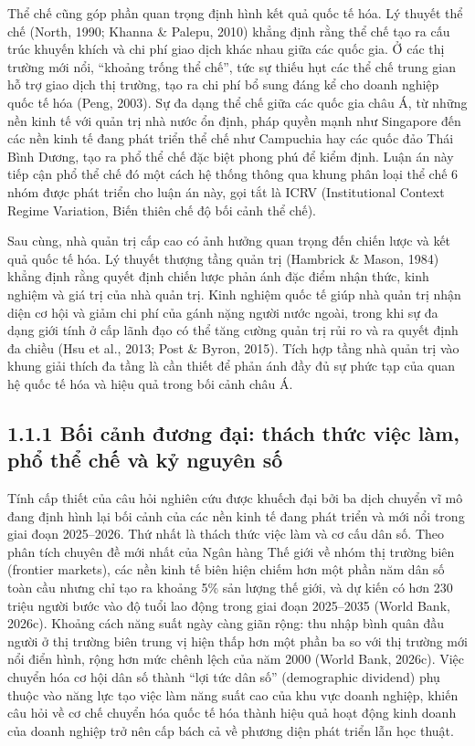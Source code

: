 \documentclass[
  a4paper,
  13pt]{extreport}
\begin{document}
Thể chế cũng góp phần quan trọng định hình kết quả quốc tế hóa. Lý
thuyết thể chế (North, 1990; Khanna \& Palepu, 2010) khẳng định rằng thể
chế tạo ra cấu trúc khuyến khích và chi phí giao dịch khác nhau giữa các
quốc gia. Ở các thị trường mới nổi, ``khoảng trống thể chế'', tức sự
thiếu hụt các thể chế trung gian hỗ trợ giao dịch thị trường, tạo ra chi
phí bổ sung đáng kể cho doanh nghiệp quốc tế hóa (Peng, 2003). Sự đa
dạng thể chế giữa các quốc gia châu Á, từ những nền kinh tế với quản trị
nhà nước ổn định, pháp quyền mạnh như Singapore đến các nền kinh tế đang
phát triển thể chế như Campuchia hay các quốc đảo Thái Bình Dương, tạo
ra phổ thể chế đặc biệt phong phú để kiểm định. Luận án này tiếp cận phổ
thể chế đó một cách hệ thống thông qua khung phân loại thể chế 6 nhóm
được phát triển cho luận án này, gọi tắt là ICRV (Institutional Context
Regime Variation, Biến thiên chế độ bối cảnh thể chế).

Sau cùng, nhà quản trị cấp cao có ảnh hưởng quan trọng đến chiến lược và
kết quả quốc tế hóa. Lý thuyết thượng tầng quản trị (Hambrick \& Mason,
1984) khẳng định rằng quyết định chiến lược phản ánh đặc điểm nhận thức,
kinh nghiệm và giá trị của nhà quản trị. Kinh nghiệm quốc tế giúp nhà
quản trị nhận diện cơ hội và giảm chi phí của gánh nặng người nước
ngoài, trong khi sự đa dạng giới tính ở cấp lãnh đạo có thể tăng cường
quản trị rủi ro và ra quyết định đa chiều (Hsu et al., 2013; Post \&
Byron, 2015). Tích hợp tầng nhà quản trị vào khung giải thích đa tầng là
cần thiết để phản ánh đầy đủ sự phức tạp của quan hệ quốc tế hóa và hiệu
quả trong bối cảnh châu Á.

\hypertarget{bux1ed1i-cux1ea3nh-ux111ux1b0ux1a1ng-ux111ux1ea1i-thuxe1ch-thux1ee9c-viux1ec7c-luxe0m-phux1ed5-thux1ec3-chux1ebf-vuxe0-kux1ef7-nguyuxean-sux1ed1}{%
\subsection{1.1.1 Bối cảnh đương đại: thách thức việc làm, phổ thể chế
và kỷ nguyên
số}\label{bux1ed1i-cux1ea3nh-ux111ux1b0ux1a1ng-ux111ux1ea1i-thuxe1ch-thux1ee9c-viux1ec7c-luxe0m-phux1ed5-thux1ec3-chux1ebf-vuxe0-kux1ef7-nguyuxean-sux1ed1}}

Tính cấp thiết của câu hỏi nghiên cứu được khuếch đại bởi ba dịch chuyển
vĩ mô đang định hình lại bối cảnh của các nền kinh tế đang phát triển và
mới nổi trong giai đoạn 2025--2026. Thứ nhất là thách thức việc làm và
cơ cấu dân số. Theo phân tích chuyên đề mới nhất của Ngân hàng Thế giới
về nhóm thị trường biên (frontier markets), các nền kinh tế biên hiện
chiếm hơn một phần năm dân số toàn cầu nhưng chỉ tạo ra khoảng 5\% sản
lượng thế giới, và dự kiến có hơn 230 triệu người bước vào độ tuổi lao
động trong giai đoạn 2025--2035 (World Bank, 2026c). Khoảng cách năng
suất ngày càng giãn rộng: thu nhập bình quân đầu người ở thị trường biên
trung vị hiện thấp hơn một phần ba so với thị trường mới nổi điển hình,
rộng hơn mức chênh lệch của năm 2000 (World Bank, 2026c). Việc chuyển
hóa cơ hội dân số thành ``lợi tức dân số'' (demographic dividend) phụ
thuộc vào năng lực tạo việc làm năng suất cao của khu vực doanh nghiệp,
khiến câu hỏi về cơ chế chuyển hóa quốc tế hóa thành hiệu quả hoạt động
kinh doanh của doanh nghiệp trở nên cấp bách cả về phương diện phát
triển lẫn học thuật.
\end{document}
